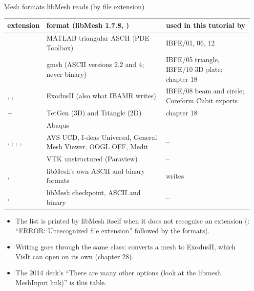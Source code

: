 \documentclass[aspectratio=169,11pt]{beamer}
\begin{document}
\begin{frame}{Mesh formats libMesh reads (by file extension)}
\label{fr:formats}
\footnotesize
\begin{tabular}{@{}L{0.16\textwidth}L{0.40\textwidth}L{0.36\textwidth}@{}}
\toprule
extension & format (libMesh 1.7.8, ) & used in this tutorial by \\
\midrule
{} & MATLAB triangular ASCII (PDE Toolbox) & IBFE/01, 06, 12 \\
 & gmsh (ASCII versions 2.2 and 4; never binary) & IBFE/05 triangle, IBFE/10 3D plate; chapter 18 \\
, ,  & ExodusII (also what IBAMR writes) & IBFE/08 beam and circle; Coreform Cubit exports \\
 +  & TetGen (3D) and Triangle (2D) & chapter 18 \\
 & Abaqus & -- \\
, , , ,  & AVS UCD, I-deas Universal, General Mesh Viewer, OOGL OFF, Medit & -- \\
 & VTK unstructured (Paraview) & -- \\
,  & libMesh's own ASCII and binary formats &  writes  \\
,  & libMesh checkpoint, ASCII and binary & -- \\
\bottomrule
\end{tabular}

\medskip
\begin{itemize}
  \item The list is printed by libMesh itself when it does not recognise an extension (: ``ERROR: Unrecognized file extension'' followed by the formats).
  \item Writing goes through the same class:  converts a  mesh to ExodusII, which VisIt can open on its own (chapter 28).
  \item The 2014 deck's ``There are many other options (look at the libmesh MeshInput link)'' is this table.
\end{itemize}
\end{frame}
\end{document}

